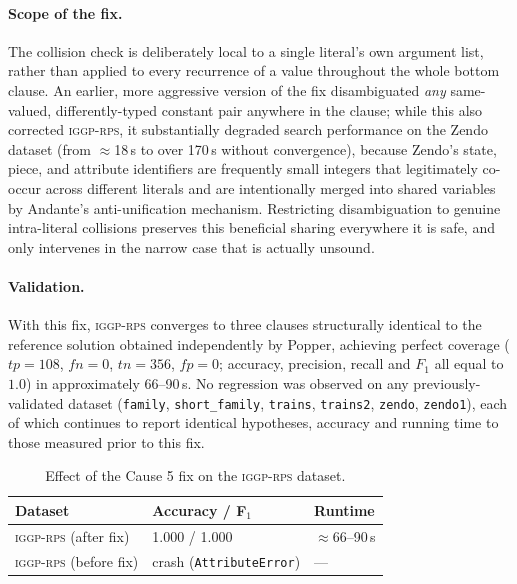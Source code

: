 \paragraph{Scope of the fix.} The collision check is deliberately local
to a single literal's own argument list, rather than applied to every
recurrence of a value throughout the whole bottom clause. An earlier,
more aggressive version of the fix disambiguated \emph{any} same-valued,
differently-typed constant pair anywhere in the clause; while this also
corrected \textsc{iggp-rps}, it substantially degraded search performance
on the Zendo dataset (from $\approx$18\,s to over 170\,s without
convergence), because Zendo's state, piece, and attribute identifiers are
frequently small integers that legitimately co-occur across different
literals and are intentionally merged into shared variables by Andante's
anti-unification mechanism. Restricting disambiguation to genuine
intra-literal collisions preserves this beneficial sharing everywhere it
is safe, and only intervenes in the narrow case that is actually
unsound.

\paragraph{Validation.} With this fix, \textsc{iggp-rps} converges to
three clauses structurally identical to the reference solution obtained
independently by Popper, achieving perfect coverage
($tp=108$, $fn=0$, $tn=356$, $fp=0$; accuracy, precision, recall and
$F_1$ all equal to $1.0$) in approximately 66--90\,s. No regression was
observed on any previously-validated dataset (\texttt{family},
\texttt{short\_family}, \texttt{trains}, \texttt{trains2}, \texttt{zendo},
\texttt{zendo1}), each of which continues to report identical hypotheses,
accuracy and running time to those measured prior to this fix.

\begin{table}[h]
\centering
\begin{tabular}{@{}lll@{}}
\toprule
Dataset & Accuracy / F$_1$ & Runtime \\
\midrule
\textsc{iggp-rps} (after fix) & 1.000 / 1.000 & $\approx$66--90\,s \\
\textsc{iggp-rps} (before fix) & crash (\texttt{AttributeError}) & --- \\
\bottomrule
\end{tabular}
\caption{Effect of the Cause 5 fix on the \textsc{iggp-rps} dataset.}
\end{table}
